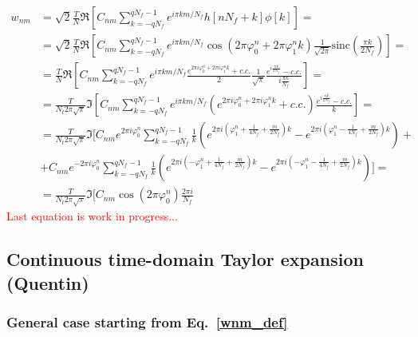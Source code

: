 \documentclass{article}
\begin{document}
\begin{align}
w_{n m}&=\sqrt{2} \frac{T}{N} \Re \left[C_{n m} \sum_{k=-qN_f}^{qN_f-1} e^{i \pi k m / N_f} h\left[n N_f+k\right] \phi[k]\right]=\nonumber\\
&=\sqrt{2} \frac{T}{N} \Re \left[C_{n m} \sum_{k=-qN_f}^{qN_f-1} e^{i \pi k m / N_f}\cos\left(2\pi\varphi_0^n+2\pi\varphi_1^n k\right)\frac{1}{\sqrt{2\pi}}\text{sinc}\left(\frac{\pi k}{2 N_f}\right)\right]=\nonumber\\
&=\frac{T}{N} \Re \left[C_{n m} \sum_{k=-qN_f}^{qN_f-1} e^{i \pi k m / N_f}\frac{e^{2\pi i\varphi_0^n+2\pi i\varphi_1^n k}+c.c.}{2}\frac{1}{\sqrt{\pi}}\frac{e^{i\frac{\pi k}{2 N_f}}-c.c.}{i\frac{\pi k}{N_f}}\right]=\nonumber\\
&=\frac{T}{N_t2\pi\sqrt{\pi}} \Im \left[C_{n m} \sum_{k=-qN_f}^{qN_f-1} e^{i \pi k m / N_f}\left(e^{2\pi i\varphi_0^n+2\pi i\varphi_1^n k}+c.c.\right)\frac{e^{i\frac{\pi k}{2 N_f}}-c.c.}{k}\right]=\nonumber\\
&= \frac{T}{N_t2\pi\sqrt{\pi}} \Im \Bigg[C_{n m} e^{2\pi i\varphi_0^n}\sum_{k=-qN_f}^{qN_f-1}\frac{1}{k}\left(e^{2\pi i\left(\varphi_1^n+\frac{1}{4N_f}+\frac{m}{2N_f}\right) k}-e^{2\pi i\left(\varphi_1^n-\frac{1}{4N_f}+\frac{m}{2N_f}\right) k}\right)+\nonumber\\
&+C_{n m} e^{-2\pi i\varphi_0^n}\sum_{k=-qN_f}^{qN_f-1}\frac{1}{k}\left(e^{2\pi i\left(-\varphi_1^n+\frac{1}{4N_f}+\frac{m}{2N_f}\right) k}-e^{2\pi i\left(-\varphi_1^n-\frac{1}{4N_f}+\frac{m}{2N_f}\right) k}\right)\Bigg]=\nonumber\\
&=\frac{T}{N_t2\pi\sqrt{\pi}} \Im \Bigg[C_{n m} \cos(2\pi\varphi_0^n)\frac{2\pi i}{N_f}
\end{align}
\textcolor{red}{Last equation is work in progress...}

\subsection{Continuous time-domain Taylor expansion (Quentin)}

\subsubsection{General case starting from Eq.~\eqref{wnm_def}}
\end{document}
